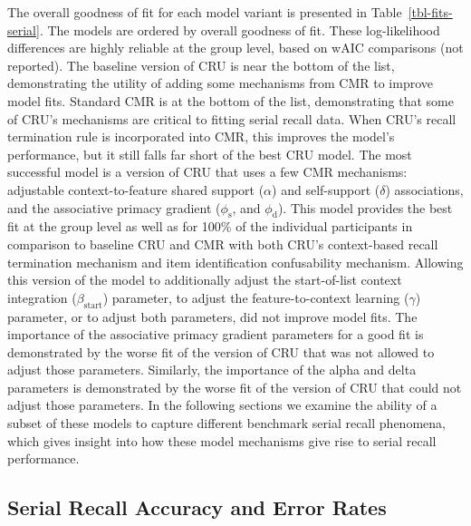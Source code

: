 \documentclass[
  letterpaper,
  DIV=11,
  numbers=noendperiod]{scrartcl}
\begin{document}
The overall goodness of fit for each model variant is presented in
Table~\ref{tbl-fits-serial}. The models are ordered by overall goodness
of fit. These log-likelihood differences are highly reliable at the
group level, based on wAIC comparisons (not reported). The baseline
version of CRU is near the bottom of the list, demonstrating the utility
of adding some mechanisms from CMR to improve model fits. Standard CMR
is at the bottom of the list, demonstrating that some of CRU's
mechanisms are critical to fitting serial recall data. When CRU's recall
termination rule is incorporated into CMR, this improves the model's
performance, but it still falls far short of the best CRU model. The
most successful model is a version of CRU that uses a few CMR
mechanisms: adjustable context-to-feature shared support (\(\alpha\))
and self-support (\(\delta\)) associations, and the associative primacy
gradient (\(\phi_\text{s}\), and \(\phi_\text{d}\)). This model provides
the best fit at the group level as well as for 100\% of the individual
participants in comparison to baseline CRU and CMR with both CRU's
context-based recall termination mechanism and item identification
confusability mechanism. Allowing this version of the model to
additionally adjust the start-of-list context integration
(\(\beta_\text{start}\)) parameter, to adjust the feature-to-context
learning (\(\gamma\)) parameter, or to adjust both parameters, did not
improve model fits. The importance of the associative primacy gradient
parameters for a good fit is demonstrated by the worse fit of the
version of CRU that was not allowed to adjust those parameters.
Similarly, the importance of the alpha and delta parameters is
demonstrated by the worse fit of the version of CRU that could not
adjust those parameters. In the following sections we examine the
ability of a subset of these models to capture different benchmark
serial recall phenomena, which gives insight into how these model
mechanisms give rise to serial recall performance.

\subsection{Serial Recall Accuracy and Error
Rates}\label{serial-recall-accuracy-and-error-rates}
\end{document}
